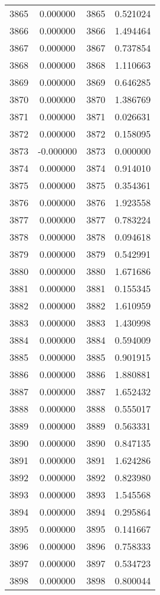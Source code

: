 \documentclass[12pt]{article}
\begin{document}
\begin{longtable}{@{}cccc@{}}
3865 & 0.000000 & 3865 & 0.521024 \\
3866 & 0.000000 & 3866 & 1.494464 \\
3867 & 0.000000 & 3867 & 0.737854 \\
3868 & 0.000000 & 3868 & 1.110663 \\
3869 & 0.000000 & 3869 & 0.646285 \\
3870 & 0.000000 & 3870 & 1.386769 \\
3871 & 0.000000 & 3871 & 0.026631 \\
3872 & 0.000000 & 3872 & 0.158095 \\
3873 & -0.000000 & 3873 & 0.000000 \\
3874 & 0.000000 & 3874 & 0.914010 \\
3875 & 0.000000 & 3875 & 0.354361 \\
3876 & 0.000000 & 3876 & 1.923558 \\
3877 & 0.000000 & 3877 & 0.783224 \\
3878 & 0.000000 & 3878 & 0.094618 \\
3879 & 0.000000 & 3879 & 0.542991 \\
3880 & 0.000000 & 3880 & 1.671686 \\
3881 & 0.000000 & 3881 & 0.155345 \\
3882 & 0.000000 & 3882 & 1.610959 \\
3883 & 0.000000 & 3883 & 1.430998 \\
3884 & 0.000000 & 3884 & 0.594009 \\
3885 & 0.000000 & 3885 & 0.901915 \\
3886 & 0.000000 & 3886 & 1.880881 \\
3887 & 0.000000 & 3887 & 1.652432 \\
3888 & 0.000000 & 3888 & 0.555017 \\
3889 & 0.000000 & 3889 & 0.563331 \\
3890 & 0.000000 & 3890 & 0.847135 \\
3891 & 0.000000 & 3891 & 1.624286 \\
3892 & 0.000000 & 3892 & 0.823980 \\
3893 & 0.000000 & 3893 & 1.545568 \\
3894 & 0.000000 & 3894 & 0.295864 \\
3895 & 0.000000 & 3895 & 0.141667 \\
3896 & 0.000000 & 3896 & 0.758333 \\
3897 & 0.000000 & 3897 & 0.534723 \\
3898 & 0.000000 & 3898 & 0.800044 \\

\end{longtable}
\end{document}
